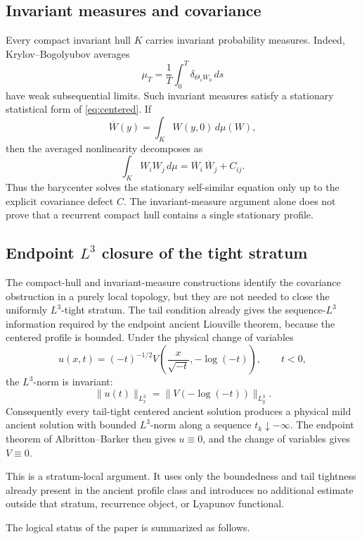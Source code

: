 \documentclass[11pt]{amsart}
\theoremstyle{plain}
\theoremstyle{definition}
\theoremstyle{remark}
\numberwithin{equation}{section}
\begin{document}
\subsection{Invariant measures and covariance}

Every compact invariant hull \(K\) carries invariant probability measures.
Indeed, Krylov--Bogolyubov averages
\[
   \mu_T=\frac1T\int_0^T\delta_{\Theta_sW_0}\,ds
\]
have weak subsequential limits.  Such invariant measures satisfy a stationary
statistical form of \eqref{eq:centered}.  If
\[
   \overline W(y)=\int_K W(y,0)\,d\mu(W),
\]
then the averaged nonlinearity decomposes as
\[
   \int_K W_iW_j\,d\mu
   =
   \overline W_i\,\overline W_j+C_{ij}.
\]
Thus the barycenter solves the stationary self-similar equation only up to the
explicit covariance defect \(C\).  The invariant-measure argument alone does
not prove that a recurrent compact hull contains a single stationary profile.

\subsection{\texorpdfstring{Endpoint \(L^3\) closure of the tight stratum}{Endpoint L3 closure of the tight stratum}}

The compact-hull and invariant-measure constructions identify the covariance
obstruction in a purely local topology, but they are not needed to close the
uniformly \(L^3\)-tight stratum.  The tail condition already gives the
sequence-\(L^3\) information required by the endpoint ancient Liouville theorem,
because the centered profile is bounded.  Under the physical change of variables
\[
   u(x,t)=(-t)^{-1/2}
   V\left(\frac{x}{\sqrt{-t}},-\log(-t)\right),
   \qquad t<0,
\]
the \(L^3\)-norm is invariant:
\[
   \|u(t)\|_{L^3_x}
   =
   \|V(-\log(-t))\|_{L^3_y}.
\]
Consequently every tail-tight centered ancient solution produces
a physical mild ancient solution with bounded \(L^3\)-norm along a
sequence \(t_k\downarrow-\infty\).  The endpoint theorem of
Albritton--Barker \cite{AlbrittonBarker2019} then gives \(u\equiv0\), and the
change of variables gives \(V\equiv0\).

This is a stratum-local argument.  It uses only the boundedness and tail
tightness already present in the ancient profile class and introduces no
additional estimate outside that stratum, recurrence object, or Lyapunov
functional.

The logical status of the paper is summarized as follows.
\end{document}
